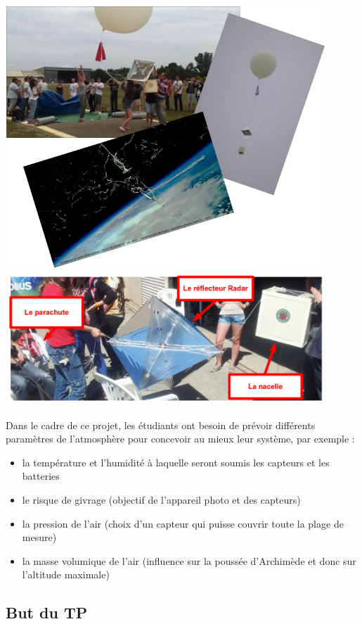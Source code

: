 \documentclass[10pt]{article}
\begin{document}
\begin{center}
\includegraphics[width=12cm]{images/solarpi3.jpg}\\
\includegraphics[width=12cm]{images/solarpi1.png}
\end{center}


Dans le cadre de ce projet, les étudiants ont besoin de prévoir différents paramètres de l'atmosphère pour concevoir au mieux leur système, par exemple :
\begin{itemize}
\item la température et l'humidité à laquelle seront soumis les capteurs et les batteries
\item le risque de givrage (objectif de l'appareil photo et des capteurs)
\item la pression de l'air (choix d'un capteur qui puisse couvrir toute la plage de mesure)
\item la masse volumique de l'air (influence sur la poussée d'Archimède et donc sur l'altitude maximale)
\end{itemize}

\subsection{But du TP}
\end{document}

